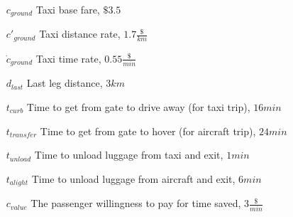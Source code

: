 \documentclass[12pt, letter]{article}
\begin{document}
\begin{itemize}
	\item[$c_{ground}$] Taxi base fare, $\$3.5$
	\item[$c'_{ground}$] Taxi distance rate, $1.7 \frac{\$}{km}$
	\item[$\dot{c}_{ground}$] Taxi time rate, $0.55 \frac{\$}{min}$
	\item[$d_{last}$] Last leg distance, $3 km$
	\item[$t_{curb}$] Time to get from gate to drive away (for taxi trip), $16 min$
	\item[$t_{transfer}$] Time to get from gate to hover (for aircraft trip), $24 min$
	\item[$t_{unload}$] Time to unload luggage from taxi and exit, $1 min$
	\item[$t_{alight}$] Time to unload luggage from aircraft and exit, $6 min$
	\item[$c_{value}$] The passenger willingness to pay for time saved, $3\frac{\$}{min}$
	\item[]
\end{itemize}
\end{document}
